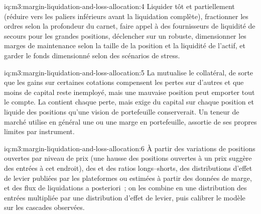 \begin{solution}{iq:m3:margin-liquidation-and-loss-allocation:4}
Liquider tôt et partiellement (réduire vers les paliers inférieurs avant la liquidation complète), fractionner les ordres selon la profondeur du carnet, faire appel à des fournisseurs de liquidité de secours
pour les grandes positions, déclencher sur un  robuste, dimensionner les marges de maintenance selon la taille de la position et la liquidité
de l'actif, et garder le fonds dimensionné selon des scénarios de stress.
\end{solution}

\begin{solution}{iq:m3:margin-liquidation-and-loss-allocation:5}
La  mutualise le collatéral, de sorte que les gains sur certaines cotations compensent les pertes sur d'autres et que moins de capital reste inemployé, mais une
mauvaise position peut emporter tout le compte. La  contient chaque perte, mais exige du capital sur chaque position et liquide
des positions qu'une vision de portefeuille conserverait. Un teneur de marché utilise en général une  ou une marge en portefeuille, assortie de ses propres limites par instrument.
\end{solution}

\begin{solution}{iq:m3:margin-liquidation-and-loss-allocation:6}
À partir des variations de positions ouvertes par niveau de prix (une hausse des positions ouvertes à un prix suggère des entrées à cet endroit), des  et des ratios
longs--shorts, des distributions d'effet de levier publiées par les plateformes ou estimées à partir des données de marge, et des flux de liquidations a posteriori~; on les combine
en une distribution des entrées multipliée par une distribution d'effet de levier, puis calibrer le modèle sur les cascades observées.
\end{solution}
